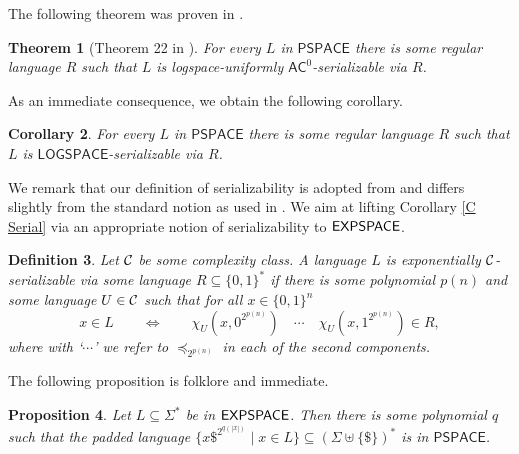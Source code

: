 \documentclass[times,envcountsame]{llncs}
\newtheorem{theorem}{{\bf Theorem}}[section]
\newtheorem{corollary}[theorem]{{\bf Corollary}}
\newtheorem{definition}[theorem]{{\bf Definition}}
\newtheorem{proposition}[theorem]{{\bf Proposition}}
\def\AC{{\mathrm{AC}}}
\def\PSPACE{{\mathsf{PSPACE}}}
\renewcommand{\L}{\mathsf{LOGSPACE}}
\begin{document}
\noindent
The following theorem was proven in \cite{GoLo09}.

\begin{theorem}[Theorem 22 in \cite{GoLo09}]{\label{T Serial}}
For every $L$ in $\PSPACE$ there is some regular language $R$ such that $L$ is
logspace-uniformly $\mathsf{AC}^0$-serializable via $R$.
\end{theorem}

\noindent
As an immediate consequence, we obtain the following corollary.

\begin{corollary}{\label{C Serial}}
For every $L$ in $\PSPACE$ there is some regular language $R$ such that $L$ is
$\L$-serializable via $R$.
\end{corollary}

\noindent
We remark that our definition of serializability is adopted from \cite{GoLo09}
and differs slightly from the standard
notion as used in \cite{CaFu91,HLSVW93,Vol98}.
We aim at lifting Corollary \ref{C Serial} via an appropriate notion of
serializability to ${\mathsf{EXPSPACE}}$.

\begin{definition}
Let $\mathcal{C}$ be some complexity class.
A language $L$ is {\em exponentially $\mathcal{C}$-serializable via some language
$R\subseteq\{0,1\}^*$} if there is some polynomial $p(n)$ and some language
$U\in\mathcal{C}$ such that for all $x\in\{0,1\}^n$
$$x\in L\qquad\!\!\iff\qquad\!\!
\chi_U\left(x,0^{2^{p(n)}}\right)\quad \cdots\quad \chi_U\left(x,1^{2^{p(n)}}\right)\in
R,$$ where with `$\cdots$' we
refer to $\preceq_{2^{p(n)}}$ in each of the second components.
\end{definition}


\noindent
The following proposition is folklore and immediate.
\begin{proposition}{\label{P Padding}}
Let $L\subseteq\Sigma^*$ be in ${\mathsf{EXPSPACE}}$. Then there is some polynomial $q$
such that the padded language
$\{x\$^{2^{q(|x|)}}\mid x\in L\}\subseteq(\Sigma\uplus\{\$\})^*$ is in $\PSPACE$.
\end{proposition}
\end{document}
